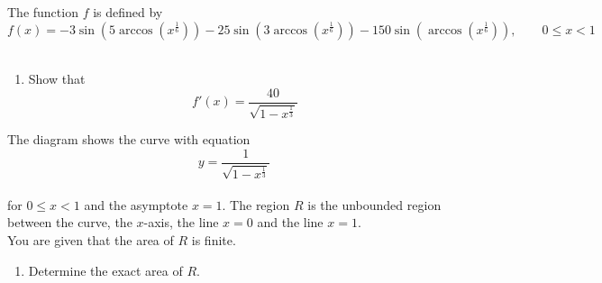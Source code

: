 \documentclass[leqno]{article}
\begin{document}
\begin{enumerate}[
  label=\textbf{\arabic*.},
  leftmargin=*,
  topsep=0pt,
  partopsep=0pt,
  parsep=0pt
]
The function $f$ is defined by
\[
f(x)=-3\sin\left(5\arccos\left(x^{\frac{1}{6}}\right)\right)-25\sin\left(3\arccos\left(x^{\frac{1}{6}}\right)\right)-150\sin\left(\arccos\left(x^{\frac{1}{6}}\right)\right), \qquad 0\le x<1
\] \\
\begin{enumerate}[label=\textbf{(\alph*)}, resume]
  \item Show that
  \[
  f'(x)=\frac{40}{\sqrt{1-x^{\frac{1}{3}}}}
  \]
\end{enumerate}
The diagram shows the curve with equation
\[
y=\frac{1}{\sqrt{1-x^{\frac{1}{3}}}}
\] \\
for $0\le x<1$ and the asymptote $x=1$. The region $R$ is the unbounded region between the curve, the $x$-axis, the line $x=0$ and the line $x=1$. \\
You are given that the area of $R$ is finite. \\
\begin{enumerate}[label=\textbf{(\alph*)}, resume]
  \item Determine the exact area of $R$.  \\
\end{enumerate}
\end{enumerate}
\end{document}
